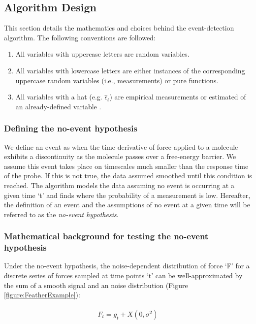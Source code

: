 \documentclass[%
  aip,12pt,tightenlines,
  amsthm,
 amsmath,amssymb
]{article}
\newcommand{\eqs}[1]{
\begin{align*} 
\begin{split}
#1
\end{split}					
\end{align*}}
\newcommand{\fRef}[1]{Figure \ref{figure:#1}}
\newcommand{\sLabel}[1]{\label{section:#1}}
\newcommand{\firstp}[0]{}
\begin{document}
\subsection{\sLabel{DesignDetails} Algorithm Design}

This section details the mathematics and choices behind the event-detection algorithm. The following conventions are followed:

\begin{enumerate}
 \item All variables with uppercase letters are random variables.
 \item All variables with lowercase letters are either instances of the corresponding uppercase random variables (i.e., measurements) or pure functions.
 \item All variables with a hat (e.g. $\hat{\epsilon}_t$) are empirical measurements or estimated of an already-defined variable .
\end{enumerate}

\subsubsection{Defining the no-event hypothesis}

\firstp We define an event as when the time derivative of force applied to a molecule exhibits a discontinuity as the molecule passes over a free-energy barrier. We assume this event takes place on timescales much smaller than the response time of the probe. If this is not true, the data assumed smoothed until this condition is reached. The algorithm models the data assuming no event is occurring at a given time `t' and finds where the probability of a measurement is low. Hereafter, the definition of an event and the assumptions of no event at a given time will be referred to as the \emph{no-event hypothesis}. 

\subsubsection{Mathematical background for testing the no-event hypothesis}

\firstp Under the no-event hypothesis, the noise-dependent distribution of force `F' for a discrete series of forces sampled at time points `t' can be well-approximated by the sum of a smooth signal and an noise distribution (\fRef{FeatherExample}):

\eqs{ F_t = g_t + X(0,\sigma^2) }
\end{document}
